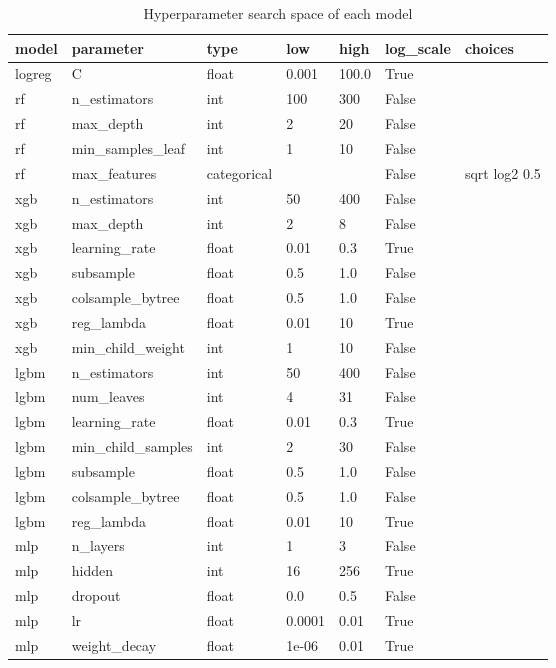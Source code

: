 \begin{table}[t]
\centering
\scriptsize
\caption{Hyperparameter search space of each model}
\begin{tabular}{lllllll}
\toprule
model & parameter & type & low & high & log\_scale & choices \\
\midrule
logreg & C & float & 0.001 & 100.0 & True &  \\
rf & n\_estimators & int & 100 & 300 & False &  \\
rf & max\_depth & int & 2 & 20 & False &  \\
rf & min\_samples\_leaf & int & 1 & 10 & False &  \\
rf & max\_features & categorical &  &  & False & sqrt log2 0.5 \\
xgb & n\_estimators & int & 50 & 400 & False &  \\
xgb & max\_depth & int & 2 & 8 & False &  \\
xgb & learning\_rate & float & 0.01 & 0.3 & True &  \\
xgb & subsample & float & 0.5 & 1.0 & False &  \\
xgb & colsample\_bytree & float & 0.5 & 1.0 & False &  \\
xgb & reg\_lambda & float & 0.01 & 10 & True &  \\
xgb & min\_child\_weight & int & 1 & 10 & False &  \\
lgbm & n\_estimators & int & 50 & 400 & False &  \\
lgbm & num\_leaves & int & 4 & 31 & False &  \\
lgbm & learning\_rate & float & 0.01 & 0.3 & True &  \\
lgbm & min\_child\_samples & int & 2 & 30 & False &  \\
lgbm & subsample & float & 0.5 & 1.0 & False &  \\
lgbm & colsample\_bytree & float & 0.5 & 1.0 & False &  \\
lgbm & reg\_lambda & float & 0.01 & 10 & True &  \\
mlp & n\_layers & int & 1 & 3 & False &  \\
mlp & hidden & int & 16 & 256 & True &  \\
mlp & dropout & float & 0.0 & 0.5 & False &  \\
mlp & lr & float & 0.0001 & 0.01 & True &  \\
mlp & weight\_decay & float & 1e-06 & 0.01 & True &  \\

\end{tabular}
\end{table}
